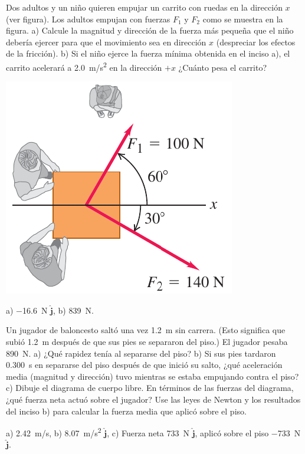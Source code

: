 \documentclass[11pt]{article}
\begin{document}
\begin{multicols}{2}
\begin{exercise}
    Dos adultos y un niño quieren empujar un carrito con ruedas en la dirección $x$ (ver figura). Los adultos empujan con fuerzas $F_1$ y $F_2$ como se muestra en la figura. a) Calcule la magnitud y dirección de la fuerza más pequeña que el niño debería ejercer para que el movimiento sea en dirección $x$ (despreciar los efectos de la fricción). b) Si el niño ejerce la fuerza mínima obtenida en el inciso a), el carrito acelerará a \qty{2.0}{m/s^2} en la dirección $+x$ ¿Cuánto pesa el carrito?
\begin{center}
    \includegraphics[scale=0.45]{figs/prob-03.png}
\end{center}
\end{exercise}
\begin{solution}
    a) \qty{-16.6}{N} $\hat{\bm{j}}$, b) \qty{839}{N}.
\end{solution}
\end{multicols}

\begin{multicols}{2}
\begin{exercise}
    Un jugador de baloncesto saltó una vez \qty{1.2}{m} sin carrera. (Esto significa que subió \qty{1.2}{m} después de que sus pies se separaron del piso.) El jugador pesaba \qty{890}{N}. a) ¿Qué rapidez tenía al separarse del piso? b) Si sus pies tardaron \qty{0.300}{s} en separarse del piso después de que inició su salto, ¿qué aceleración media (magnitud y dirección) tuvo mientras se estaba empujando contra el piso? c) Dibuje el diagrama de cuerpo libre. En términos de las fuerzas del diagrama, ¿qué fuerza neta actuó sobre el jugador? Use las leyes de Newton y los resultados del inciso b) para calcular la fuerza media que aplicó sobre el piso.
\end{exercise}
\begin{solution}
    a) \qty{2.42}{m/s}, b) \qty{8.07}{m/s^2} $\hat{\bm{j}}$, c) Fuerza neta \qty{733}{N} $\hat{\bm{j}}$, aplicó sobre el piso \qty{-733}{N} $\hat{\bm{j}}$. 
\end{solution}
\end{multicols}
\end{document}
